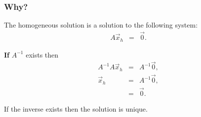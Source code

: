 \begin{frame}
  \frametitle{Why?}

  The homogeneous solution is a solution to the following system:
  \begin{eqnarray*}
    A \vec{x}_h & = & \vec{0}.
  \end{eqnarray*}

  \textbf{If} $A^{-1}$ exists then 
  \begin{eqnarray*}
    A^{-1} A \vec{x}_h & = & A^{-1} \vec{0}, \\
    \vec{x}_h & = & A^{-1} \vec{0}, \\
    & = & \vec{0}.
  \end{eqnarray*}

  If the inverse exists then the solution is unique.

\end{frame}





